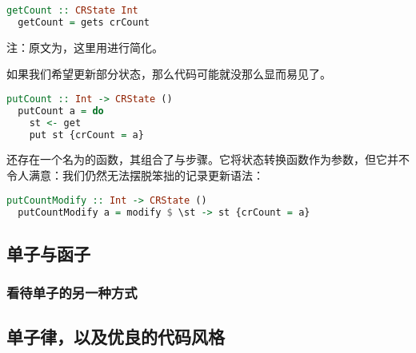 \documentclass[./main.tex]{subfiles}
\begin{document}
\begin{lstlisting}[language=Haskell]
  getCount :: CRState Int
  getCount = gets crCount
\end{lstlisting}

注：原文为，这里用进行简化。

如果我们希望更新部分状态，那么代码可能就没那么显而易见了。

\begin{lstlisting}[language=Haskell]
  putCount :: Int -> CRState ()
  putCount a = do
    st <- get
    put st {crCount = a}
\end{lstlisting}

还存在一个名为的函数，其组合了与步骤。它将状态转换函数作为参数，但它并不令人满意：我们仍然无法摆脱笨拙的记录更新语法：

\begin{lstlisting}[language=Haskell]
  putCountModify :: Int -> CRState ()
  putCountModify a = modify $ \st -> st {crCount = a}
\end{lstlisting}

\subsection*{单子与函子}


\subsubsection*{看待单子的另一种方式}

\subsection*{单子律，以及优良的代码风格}
\end{document}
